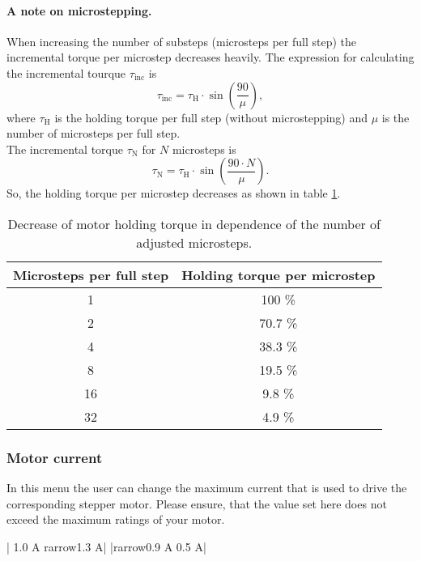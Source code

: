 \paragraph{A note on microstepping.}
When increasing the number of substeps (microsteps per full step) the incremental torque per microstep decreases heavily. The expression for calculating the incremental tourque $\tau_{\text{inc}}$ is
\begin{equation*}
  \tau_{\text{inc}} = \tau_{\text{H}} \cdot \sin \left( \frac{90}{\mu} \right),
\end{equation*}
where $\tau_{\text{H}}$ is the holding torque per full step (without microstepping) and $\mu$ is the number of microsteps per full step.\\
The incremental torque $\tau_{\text{N}}$ for $N$ microsteps is
\begin{equation*}
  \tau_{\text{N}} = \tau_{\text{H}} \cdot \sin \left( \frac{90\cdot N}{\mu} \right).
\end{equation*}
So, the holding torque per microstep decreases as shown in table \ref{tab:microstepping_holding_torque}.
\begin{table}[h]
  \caption[Holding torque vs. number of microsteps]{Decrease of motor holding torque in dependence of the number of adjusted microsteps.}
  \label{tab:microstepping_holding_torque}
  \centering
  \begin{tabular}{cc}
    \toprule
    \textbf{Microsteps per full step} & \textbf{Holding torque per microstep} \\
    \toprule
    1 & 100 \% \\ \midrule
    2 & 70.7 \%\\ \midrule
    4 & 38.3 \% \\ \midrule
    8 & 19.5 \% \\ \midrule
    16 & 9.8 \% \\ \midrule
    32 & 4.9 \% \\
    \bottomrule
  \end{tabular}
\end{table}

\subsubsection{Motor current}
\label{menu_motor_current}
In this menu the user can change the maximum current that is used to drive the corresponding stepper motor. Please ensure, that the value set here does not exceed the maximum ratings of your motor. 
\begin{center}
  | 1.0 A  {rarrow}1.3 A|
             |{rarrow}0.9 A   0.5 A|
\end{center}

